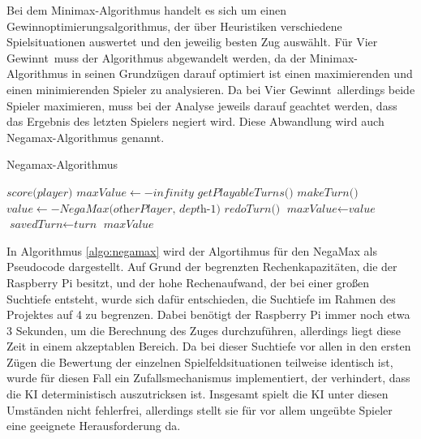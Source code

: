Bei dem Minimax-Algorithmus handelt es sich um einen Gewinnoptimierungsalgorithmus, der über Heuristiken verschiedene Spielsituationen auswertet und den jeweilig besten Zug auswählt.
Für \glqq Vier Gewinnt\grqq ~muss der Algorithmus abgewandelt werden, da der Minimax-Algorithmus in seinen Grundzügen darauf optimiert ist einen maximierenden und einen minimierenden Spieler zu analysieren. Da bei \glqq Vier Gewinnt\grqq ~allerdings beide Spieler maximieren, muss bei der Analyse jeweils darauf geachtet werden, dass das Ergebnis des letzten Spielers negiert wird. Diese Abwandlung wird auch Negamax-Algorithmus genannt.

\begin{algorithm}
\caption{Negamax-Algorithmus} \label{algo:negamax}
\begin{algorithmic}[1]
\State \Return $\textit{score(player)}$
\EndIf
\State $\textit{maxValue} \gets -\textit{infinity}$
\State $\textit{getPlayableTurns()}$
\State $\textit{makeTurn()}$
\State $\textit{value} \gets -\textit{NegaMax(otherPlayer, depth-1)}$
\State $\textit{redoTurn()}$
\State $\textit{maxValue} \gets \textit{value}$
\State $\textit{savedTurn} \gets \textit{turn}$
\EndIf
\EndIf
\EndWhile
\State \Return $\textit{maxValue}$
\EndProcedure
\end{algorithmic}
\end{algorithm}

In Algorithmus \ref{algo:negamax} wird der Algortihmus für den NegaMax als Pseudocode dargestellt.
Auf Grund der begrenzten Rechenkapazitäten, die der Raspberry Pi besitzt, und der hohe Rechenaufwand, der bei einer großen Suchtiefe entsteht, wurde sich dafür entschieden, die Suchtiefe im Rahmen des Projektes auf 4 zu begrenzen. Dabei benötigt der Raspberry Pi immer noch etwa 3 Sekunden, um die Berechnung des Zuges durchzuführen, allerdings liegt diese Zeit in einem akzeptablen Bereich. Da bei dieser Suchtiefe vor allen in den ersten Zügen die Bewertung der einzelnen Spielfeldsituationen teilweise identisch ist, wurde für diesen Fall ein Zufallsmechanismus implementiert, der verhindert, dass die KI deterministisch auszutricksen ist. Insgesamt spielt die KI unter diesen Umständen nicht fehlerfrei, allerdings stellt sie für vor allem ungeübte Spieler eine geeignete Herausforderung da.
